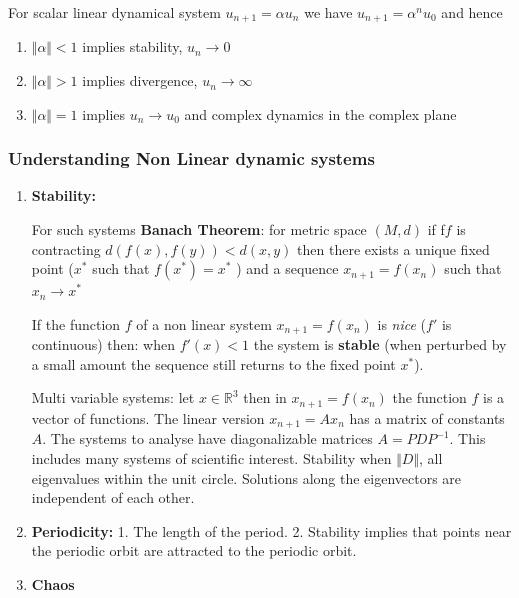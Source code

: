 For scalar linear dynamical system $u_{n+1} = \alpha u_n$ we have $u_{n+1} = \alpha^n u_0$ and hence
\begin{enumerate}
\item $\Vert \alpha\Vert  < 1$ implies stability, $u_n \rightarrow 0$
\item $\Vert \alpha\Vert  > 1$ implies divergence, $u_n \rightarrow \infty$
\item $\Vert \alpha\Vert  = 1$ implies $u_n \rightarrow u_0$ and complex dynamics in the complex plane
\end{enumerate}

\subsubsection*{\bf Understanding Non Linear dynamic systems}
\begin{enumerate}
\item {\bf Stability:}

For such systems  {\bf Banach Theorem}: for metric space $(M,d)$ if f$f$ is contracting $d(f(x), f(y))< d(x,y)$ then there exists a unique fixed point ($x^*$ such that 
$f(x^*)=x^*$ ) and a sequence $x_{n+1} = f(x_n)$ such that $x_n\rightarrow x^*$

If the function $f$ of a non linear system $x_{n+1} = f(x_n)$ is \emph{nice} ($f'$ is continuous) then: when $f'(x)< 1$  the system is {\bf stable} (when perturbed by a small amount the sequence still returns to the fixed point $x^*$).


Multi variable systems: let $x\in \mathbb{R}^3$ then in $x_{n+1} = f(x_n)$ the function $f$ is a vector of functions. The linear version $x_{n+1} = Ax_n$ has a matrix of constants $A$.
The systems to analyse have diagonalizable matrices $A = PDP^{-1}$. This includes many systems of  scientific interest. Stability when $\Vert D \Vert$, all eigenvalues within the unit circle. Solutions along the eigenvectors are independent of each other.

\item {\bf Periodicity:} 1. The length of the period. 2. Stability implies that points  near the periodic orbit are attracted to the periodic orbit.
\item {\bf Chaos}
\end{enumerate}

